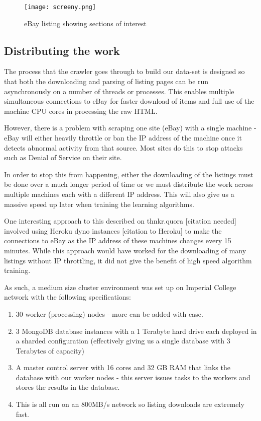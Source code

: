 \documentclass[12pt]{article}
\begin{document}
\begin{figure}
\centering
\texttt{[image: screeny.png]}
\caption{eBay listing showing sections of interest}
\end{figure}



\subsection{Distributing the work}

The process that the crawler goes through to build our data-set is designed so that both the downloading and parsing of listing pages can be run asynchronously on a number of threads or processes. This enables multiple simultaneous connections to eBay for faster download of items and full use of the machine CPU cores in processing the raw HTML.

However, there is a problem with scraping one site (eBay) with a single machine - eBay will either heavily throttle or ban the IP address of the machine once it detects abnormal activity from that source. Most sites do this to stop attacks such as Denial of Service on their site.

In order to stop this from happening, either the downloading of the listings must be done over a much longer period of time or we must distribute the work across multiple machines each with a different IP address. This will also give us a massive speed up later when training the learning algorithms.

One interesting approach to this described on thnkr.quora [citation needed] involved using Heroku dyno instances [citation to Heroku] to make the connections to eBay as the IP address of these machines changes every 15 minutes. While this approach would have worked for the downloading of many listings without IP throttling, it did not give the benefit of high speed algorithm training.

As such, a medium size cluster environment was set up on Imperial College network with the following specifications:
\begin{enumerate}
\item 30 worker (processing) nodes - more can be added with ease.
\item 3 MongoDB database instances with a 1 Terabyte hard drive each deployed in a sharded configuration (effectively giving us a single database with 3 Terabytes of capacity)
\item A master control server with 16 cores and 32 GB RAM that links the database with our worker nodes - this server issues tasks to the workers and stores the results in the database.
\item This is all run on an 800MB/s network so listing downloads are extremely fast.
\end{enumerate}
\end{document}
